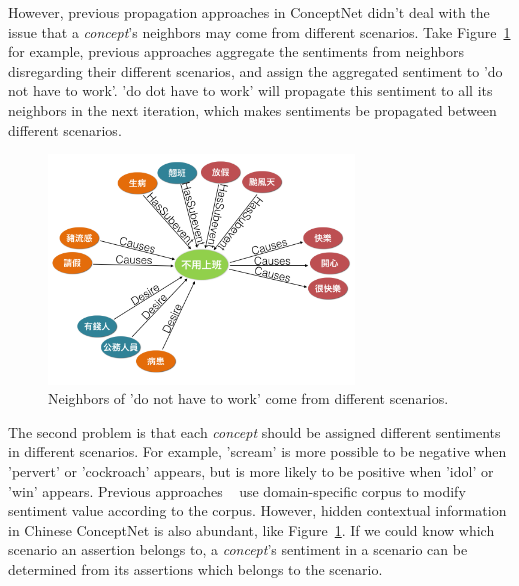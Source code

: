 However, previous propagation approaches in ConceptNet didn't deal with the issue that a {\it concept}'s neighbors may come from different scenarios. Take Figure~\ref{fig:noWork2} for example, previous approaches aggregate the sentiments from neighbors disregarding their different scenarios, and assign the aggregated sentiment to 'do not have to work'. 'do dot have to work' will propagate this sentiment to all its neighbors in the next iteration, which makes sentiments be propagated between different scenarios.

\begin{figure}[!t]
\centering
\includegraphics[width=3.2in]{fig/noWork2.png}
\caption{Neighbors of 'do not have to work' come from different scenarios.}
\label{fig:noWork2}
\end{figure}

The second problem is that each {\it concept} should be assigned different sentiments in different scenarios. For example, 'scream' is more possible to be negative when 'pervert' or 'cockroach' appears, but is more likely to be positive when 'idol' or 'win' appears. Previous approaches ~\cite{Xu:PACLIC10, Xu:COLING10, Rao:WWW14} use domain-specific corpus to modify sentiment value according to the corpus. However, hidden contextual information in Chinese ConceptNet is also abundant, like Figure~\ref{fig:noWork2}. If we could know which scenario an assertion belongs to, a {\it concept}'s sentiment in a scenario can be determined from its assertions which belongs to the scenario. 

